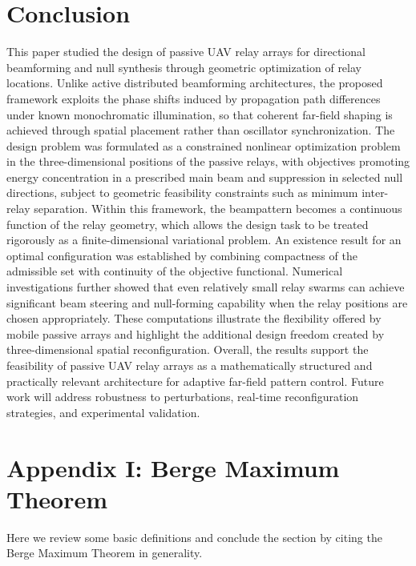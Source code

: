 \documentclass[11pt,letterpaper]{article}
\theoremstyle{definition}
\theoremstyle{plain}
\begin{document}
\section{Conclusion}
This paper studied the design of passive UAV relay arrays for directional beamforming and null synthesis through geometric optimization of relay locations. Unlike active distributed beamforming architectures, the proposed framework exploits the phase shifts induced by propagation path differences under known monochromatic illumination, so that coherent far-field shaping is achieved through spatial placement rather than oscillator synchronization.
The design problem was formulated as a constrained nonlinear optimization problem in the three-dimensional positions of the passive relays, with objectives promoting energy concentration in a prescribed main beam and suppression in selected null directions, subject to geometric feasibility constraints such as minimum inter-relay separation. Within this framework, the beampattern becomes a continuous function of the relay geometry, which allows the design task to be treated rigorously as a finite-dimensional variational problem.
An existence result for an optimal configuration was established by combining compactness of the admissible set with continuity of the objective functional. Numerical investigations further showed that even relatively small relay swarms can achieve significant beam steering and null-forming capability when the relay positions are chosen appropriately. These computations illustrate the flexibility offered by mobile passive arrays and highlight the additional design freedom created by three-dimensional spatial reconfiguration.
Overall, the results support the feasibility of passive UAV relay arrays as a mathematically structured and practically relevant architecture for adaptive far-field pattern control. Future work will address robustness to perturbations, real-time reconfiguration strategies, and experimental validation.


\nocite{*}
  

\newpage

\section{Appendix I: Berge Maximum Theorem}

Here we review some basic definitions and conclude the section by citing the Berge Maximum Theorem in generality.
\end{document}
